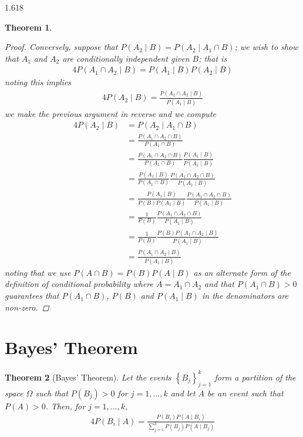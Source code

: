 \documentclass[11pt, oneside]{book}   	%
\newtheorem{theorem}{Theorem}[chapter]
\newcommand{\set}[1]{\left\{#1\right\}}
\begin{document}
\begin{spacing}{1.618}
\begin{theorem}
\begin{proof}
				Conversely, suppose that $P(A_2\mid B)=P(A_2\mid A_1\cap B)$; we wish to show that $A_1$ and $A_2$ are conditionally independent given $B$; that is 
				\begin{alignat}{4}
					P(A_1\cap A_2\mid B)=P(A_1\mid B)P(A_2\mid B)
				\end{alignat}
				noting this implies 
				\begin{alignat}{4}
					P(A_2\mid B)=\frac{P(A_1\cap A_2\mid B)}{P(A_1\mid B)}
				\end{alignat}
				we make the previous argument in reverse and we compute
				\begin{alignat}{4}
					P(A_2\mid B)&= P(A_2\mid A_1\cap B)  \\
						&= \frac{P(A_1\cap A_2\cap B)}{P(A_1\cap B)} \\
						&=\frac{P(A_1\cap A_2\cap B)}{P(A_1\cap B)} \frac{P(A_1\mid B)}{P(A_1\mid B)} \\
						&=\frac{P(A_1\mid B)}{P(A_1\cap B)}\frac{P(A_1\cap A_2\cap B)}{P(A_1\mid B)} \\
						&=\frac{P(A_1\mid B)}{P(B)P(A_1\mid B)}\frac{P(A_1\cap A_2\cap B)}{P(A_1\mid B)} \\
						&=\frac{1}{P(B)}\frac{P(A_1\cap A_2\cap B)}{P(A_1\mid B)} \\
						&=\frac{1}{P(B)}\frac{P(B)P(A_1\cap A_2\mid B)}{P(A_1\mid B)} \\
						&=\frac{P(A_1\cap A_2\mid B)}{P(A_1\mid B)}
				\end{alignat}
				noting that we use $P(A\cap B)=P(B)P(A\mid B)$ as an alternate form of the definition of conditional probability where $A=A_1\cap A_2$ and that $P(A_1\cap B)>0$ guarantees that $P(A_1\cap B)$, $P(B)$ and $P(A_1\mid B)$ in the denominators are non-zero. 
			\end{proof}
		\end{theorem}
	
	\section{Bayes' Theorem}

		\begin{theorem}[Bayes' Theorem]
			Let the events $\set{B_j}_{j=1}^k$ form a partition of the space $\Omega$ such that $P(B_j)>0$ for $j=1,\dots, k$ and let $A$ be an event such that $P(A)>0$. Then, for $j=1, \dots, k$,
			\begin{alignat}{4}
				P(B_i\mid A)=\frac{P(B_i)P(A\mid B_i)}{\sum_{j=1}^kP(B_j)P(A\mid B_j)}
			\end{alignat}
		\end{theorem}


\end{spacing}
\end{document}
